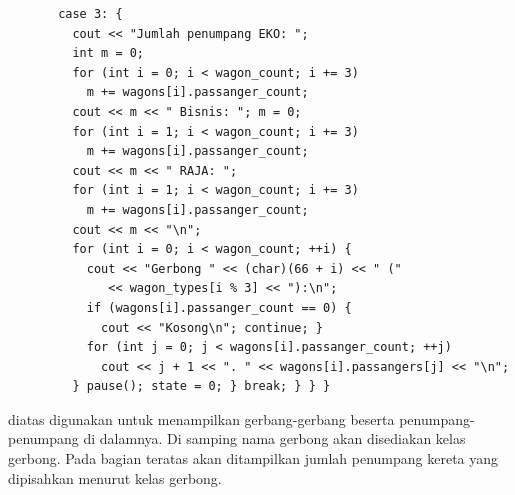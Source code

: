 \documentclass[../main.tex]{subfiles}
\begin{document}
\begin{lstlisting}
       case 3: {
         cout << "Jumlah penumpang EKO: ";
         int m = 0;
         for (int i = 0; i < wagon_count; i += 3)
           m += wagons[i].passanger_count;
         cout << m << " Bisnis: "; m = 0;
         for (int i = 1; i < wagon_count; i += 3)
           m += wagons[i].passanger_count;
         cout << m << " RAJA: ";
         for (int i = 1; i < wagon_count; i += 3)
           m += wagons[i].passanger_count;
         cout << m << "\n";
         for (int i = 0; i < wagon_count; ++i) {
           cout << "Gerbong " << (char)(66 + i) << " ("
              << wagon_types[i % 3] << "):\n";
           if (wagons[i].passanger_count == 0) {
             cout << "Kosong\n"; continue; }
           for (int j = 0; j < wagons[i].passanger_count; ++j)
             cout << j + 1 << ". " << wagons[i].passangers[j] << "\n";
         } pause(); state = 0; } break; } } }
\end{lstlisting}
    \ilz{}{\Script} diatas digunakan untuk menampilkan gerbang-gerbang beserta penumpang-penumpang di dalamnya. Di samping nama gerbong akan disediakan kelas gerbong. Pada bagian teratas akan ditampilkan jumlah penumpang kereta yang dipisahkan menurut kelas gerbong.
\end{document}

